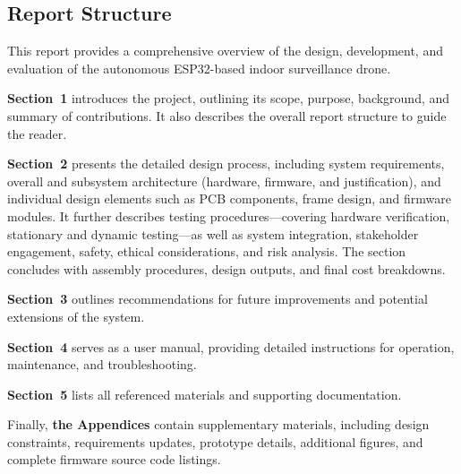 \subsection{Report Structure}
This report provides a comprehensive overview of the design, development, and evaluation of the autonomous ESP32-based indoor surveillance drone. 

\textbf{Section~1} introduces the project, outlining its scope, purpose, background, and summary of contributions. It also describes the overall report structure to guide the reader. 

\textbf{Section~2} presents the detailed design process, including system requirements, overall and subsystem architecture (hardware, firmware, and justification), and individual design elements such as PCB components, frame design, and firmware modules. It further describes testing procedures—covering hardware verification, stationary and dynamic testing—as well as system integration, stakeholder engagement, safety, ethical considerations, and risk analysis. The section concludes with assembly procedures, design outputs, and final cost breakdowns.

\textbf{Section~3} outlines recommendations for future improvements and potential extensions of the system. 

\textbf{Section~4} serves as a user manual, providing detailed instructions for operation, maintenance, and troubleshooting. 

\textbf{Section~5} lists all referenced materials and supporting documentation. 

Finally, \textbf{the Appendices} contain supplementary materials, including design constraints, requirements updates, prototype details, additional figures, and complete firmware source code listings.
